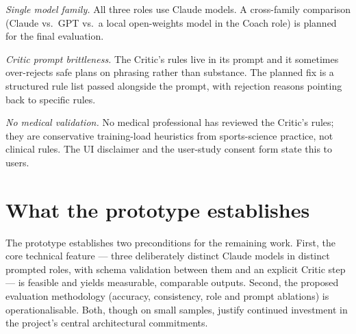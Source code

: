 \emph{Single model family.} All three roles use Claude models. A cross-family comparison (Claude vs.\ GPT vs.\ a local open-weights model in the Coach role) is planned for the final evaluation.

\emph{Critic prompt brittleness.} The Critic's rules live in its prompt and it sometimes over-rejects safe plans on phrasing rather than substance. The planned fix is a structured rule list passed alongside the prompt, with rejection reasons pointing back to specific rules.

\emph{No medical validation.} No medical professional has reviewed the Critic's rules; they are conservative training-load heuristics from sports-science practice, not clinical rules. The UI disclaimer and the user-study consent form state this to users.

\section{What the prototype establishes}

The prototype establishes two preconditions for the remaining work. First, the core technical feature --- three deliberately distinct Claude models in distinct prompted roles, with schema validation between them and an explicit Critic step --- is feasible and yields measurable, comparable outputs. Second, the proposed evaluation methodology (accuracy, consistency, role and prompt ablations) is operationalisable. Both, though on small samples, justify continued investment in the project's central architectural commitments.
